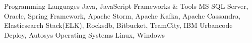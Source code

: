 \begin{cvskills}
    \cvskill
        {Programming Languages}
        {Java, JavaScript}
    \cvskill
        {Frameworks \& Tools}
        {MS SQL Server, Oracle, Spring Framework, Apache Storm, Apache Kafka, Apache Cassandra, Elasticsearch Stack(ELK), Rocksdb, Bitbucket, TeamCity, IBM Urbancode Deploy, Autosys}
    \cvskill
        {Operating Systems}
        {Linux, Windows}
\end{cvskills}
